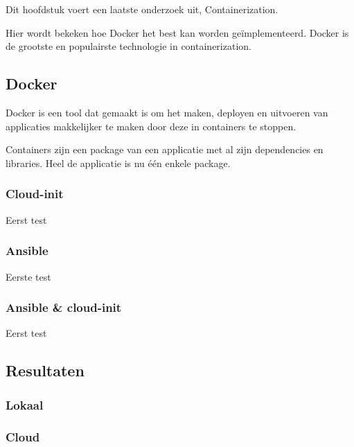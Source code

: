 \chapter{}
\label{ch:container}
Dit hoofdstuk voert een laatste onderzoek uit, Containerization.

Hier wordt bekeken hoe Docker het best kan worden geïmplementeerd. Docker is de grootste en populairste technologie in containerization.

\section{Docker}
Docker is een tool dat gemaakt is om het maken, deployen en uitvoeren van applicaties makkelijker te maken door deze in containers te stoppen. 

Containers zijn een package van een applicatie met al zijn dependencies en libraries. Heel de applicatie is nu één enkele package. \autocite{docker}


\subsection{Cloud-init}
Eerst test

\subsection{Ansible}
Eerste test

\subsection{Ansible \& cloud-init}
Eerst test

\section{Resultaten}

\subsection{Lokaal}

\subsection{Cloud}